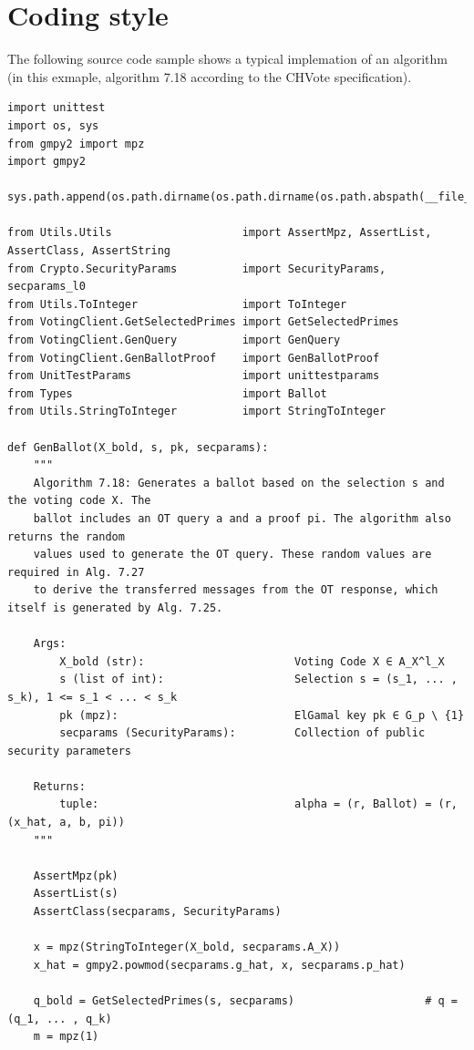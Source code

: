 \documentclass[a4paper,12pt]{report}
\begin{document}
\section{Coding style}
The following source code sample shows a typical implemation of an algorithm (in this exmaple, algorithm 7.18 according to the CHVote specification).

\begin{verbatim}
import unittest
import os, sys
from gmpy2 import mpz
import gmpy2

sys.path.append(os.path.dirname(os.path.dirname(os.path.abspath(__file__))))

from Utils.Utils                    import AssertMpz, AssertList, AssertClass, AssertString
from Crypto.SecurityParams          import SecurityParams, secparams_l0
from Utils.ToInteger                import ToInteger
from VotingClient.GetSelectedPrimes import GetSelectedPrimes
from VotingClient.GenQuery          import GenQuery
from VotingClient.GenBallotProof    import GenBallotProof
from UnitTestParams                 import unittestparams
from Types                          import Ballot
from Utils.StringToInteger          import StringToInteger

def GenBallot(X_bold, s, pk, secparams):
    """
    Algorithm 7.18: Generates a ballot based on the selection s and the voting code X. The
    ballot includes an OT query a and a proof pi. The algorithm also returns the random
    values used to generate the OT query. These random values are required in Alg. 7.27
    to derive the transferred messages from the OT response, which itself is generated by Alg. 7.25.

    Args:
        X_bold (str):                       Voting Code X ∈ A_X^l_X
        s (list of int):                    Selection s = (s_1, ... , s_k), 1 <= s_1 < ... < s_k
        pk (mpz):                           ElGamal key pk ∈ G_p \ {1}
        secparams (SecurityParams):         Collection of public security parameters

    Returns:
        tuple:                              alpha = (r, Ballot) = (r, (x_hat, a, b, pi))
    """

    AssertMpz(pk)
    AssertList(s)
    AssertClass(secparams, SecurityParams)

    x = mpz(StringToInteger(X_bold, secparams.A_X))
    x_hat = gmpy2.powmod(secparams.g_hat, x, secparams.p_hat)

    q_bold = GetSelectedPrimes(s, secparams)                    # q = (q_1, ... , q_k)
    m = mpz(1)


\end{verbatim}
\end{document}
